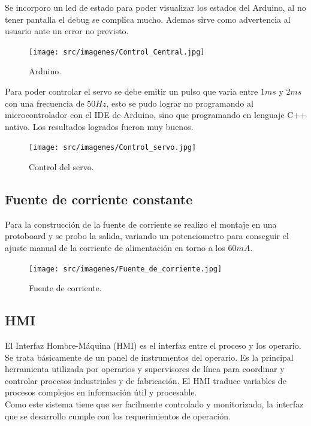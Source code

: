 \documentclass[12pt]{article}
\begin{document}
Se incorporo un led de estado para poder visualizar los estados del Arduino, al no tener pantalla el debug se complica mucho. Ademas sirve como advertencia al usuario ante un error no previsto.

\begin{figure}[H]
\centering
\texttt{[image: src/imagenes/Control\_Central.jpg]}
\label{fgr:Control_Central}
\caption{Arduino.}
\end{figure}

Para poder controlar el servo se debe emitir un pulso que varia entre $1ms$ y $2ms$ con una frecuencia de $50Hz$, esto se pudo lograr no programando al microcontrolador con el IDE de Arduino, sino que programando en lenguaje C++ nativo. Los resultados logrados fueron muy buenos.

\begin{figure}[H]
\centering
\texttt{[image: src/imagenes/Control\_servo.jpg]}
\label{fgr:Control_servo}
\caption{Control del servo.}
\end{figure}

\subsection{Fuente de corriente constante}

Para la construcción de la fuente de corriente se realizo el montaje en una protoboard y se probo la salida, variando un potenciometro para conseguir el ajuste manual de la corriente de alimentación en torno a los $60mA$.

\begin{figure}[H]
\centering
\texttt{[image: src/imagenes/Fuente\_de\_corriente.jpg]}
\label{fgr:Fuente_de_corriente}
\caption{Fuente de corriente.}
\end{figure}

\subsection{HMI}

El Interfaz Hombre-Máquina (HMI) es el interfaz entre el proceso y los operario. Se trata básicamente de un panel de instrumentos del operario. Es la principal herramienta utilizada por operarios y supervisores de línea para coordinar y controlar procesos industriales y de fabricación. El HMI traduce variables de procesos complejos en información útil y procesable. \\

Como este sistema tiene que ser facilmente controlado y monitorizado, la interfaz que se desarrollo cumple con los requerimientos de operación.
\end{document}
